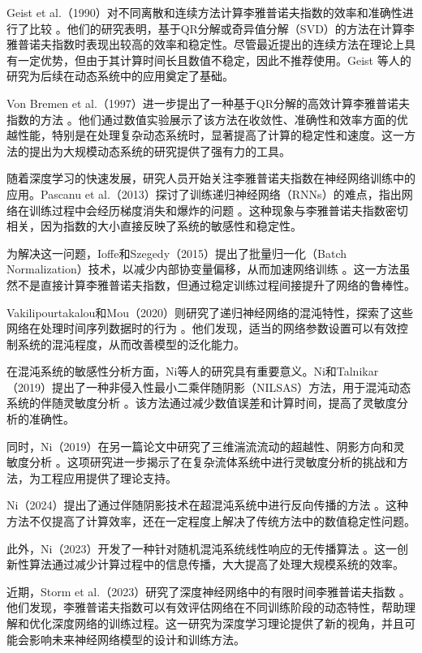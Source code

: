 Geist et al.（1990）对不同离散和连续方法计算李雅普诺夫指数的效率和准确性进行了比较 \cite{Geist1990}。他们的研究表明，基于QR分解或奇异值分解（SVD）的方法在计算李雅普诺夫指数时表现出较高的效率和稳定性。尽管最近提出的连续方法在理论上具有一定优势，但由于其计算时间长且数值不稳定，因此不推荐使用。Geist 等人的研究为后续在动态系统中的应用奠定了基础。

Von Bremen et al.（1997）进一步提出了一种基于QR分解的高效计算李雅普诺夫指数的方法 \cite{VONBREMEN19971}。他们通过数值实验展示了该方法在收敛性、准确性和效率方面的优越性能，特别是在处理复杂动态系统时，显著提高了计算的稳定性和速度。这一方法的提出为大规模动态系统的研究提供了强有力的工具。

随着深度学习的快速发展，研究人员开始关注李雅普诺夫指数在神经网络训练中的应用。Pascanu et al.（2013）探讨了训练递归神经网络（RNNs）的难点，指出网络在训练过程中会经历梯度消失和爆炸的问题 \cite{pascanu2013difficulty}。这种现象与李雅普诺夫指数密切相关，因为指数的大小直接反映了系统的敏感性和稳定性。

为解决这一问题，Ioffe和Szegedy（2015）提出了批量归一化（Batch Normalization）技术，以减少内部协变量偏移，从而加速网络训练 \cite{ioffe2015batch}。这一方法虽然不是直接计算李雅普诺夫指数，但通过稳定训练过程间接提升了网络的鲁棒性。

Vakilipourtakalou和Mou（2020）则研究了递归神经网络的混沌特性，探索了这些网络在处理时间序列数据时的行为 \cite{vakilipourtakalou2020chaotic}。他们发现，适当的网络参数设置可以有效控制系统的混沌程度，从而改善模型的泛化能力。

在混沌系统的敏感性分析方面，Ni等人的研究具有重要意义。Ni和Talnikar（2019）提出了一种非侵入性最小二乘伴随阴影（NILSAS）方法，用于混沌动态系统的伴随灵敏度分析 \cite{Ni20191}。该方法通过减少数值误差和计算时间，提高了灵敏度分析的准确性。

同时，Ni（2019）在另一篇论文中研究了三维湍流流动的超越性、阴影方向和灵敏度分析 \cite{Ni20192}。这项研究进一步揭示了在复杂流体系统中进行灵敏度分析的挑战和方法，为工程应用提供了理论支持。

Ni（2024）提出了通过伴随阴影技术在超混沌系统中进行反向传播的方法 \cite{ni2024backpropagation}。这种方法不仅提高了计算效率，还在一定程度上解决了传统方法中的数值稳定性问题。

此外，Ni（2023）开发了一种针对随机混沌系统线性响应的无传播算法 \cite{ni2023nopropagate}。这一创新性算法通过减少计算过程中的信息传播，大大提高了处理大规模系统的效率。

近期，Storm et al.（2023）研究了深度神经网络中的有限时间李雅普诺夫指数 \cite{storm2023finitetime}。他们发现，李雅普诺夫指数可以有效评估网络在不同训练阶段的动态特性，帮助理解和优化深度网络的训练过程。这一研究为深度学习理论提供了新的视角，并且可能会影响未来神经网络模型的设计和训练方法。

